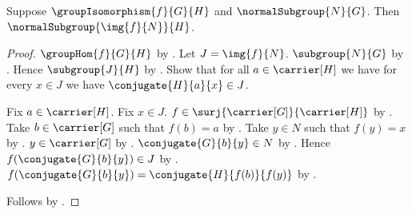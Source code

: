 \begin{theorem}\label{group_isomorphism_normal_image}
    Suppose $\groupIsomorphism{f}{G}{H}$ and
        $\normalSubgroup{N}{G}$.
    Then $\normalSubgroup{\img{f}{N}}{H}$.
\end{theorem}
\begin{proof}
    $\groupHom{f}{G}{H}$ by
        .
    Let $J=\img{f}{N}$.
    $\subgroup{N}{G}$ by .
    Hence $\subgroup{J}{H}$ by
        .
    Show that for all $a\in\carrier[H]$ we have for every $x\in J$
        we have $\conjugate{H}{a}{x}\in J$.
    \begin{subproof}
        Fix $a\in\carrier[H]$.
        Fix $x\in J$.
        $f\in\surj{\carrier[G]}{\carrier[H]}$ by
            .
        Take $b\in\carrier[G]$ such that $f(b)=a$ by
            .
        Take $y\in N$ such that $f(y)=x$ by
            .
        $y\in\carrier[G]$ by
            .
        $\conjugate{G}{b}{y}\in N$ by
            .
        Hence $f(\conjugate{G}{b}{y})\in J$ by
            .
        $f(\conjugate{G}{b}{y})=
            \conjugate{H}{f(b)}{f(y)}$ by
            .
    \end{subproof}
    Follows by .
\end{proof}
